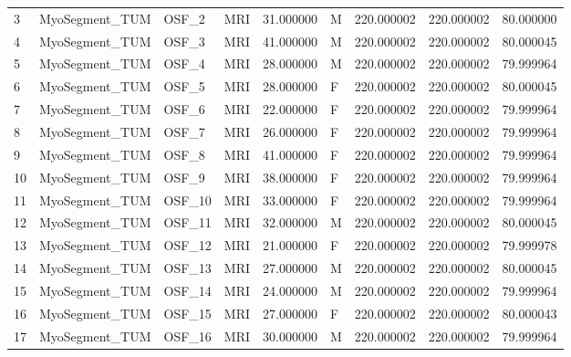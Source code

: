 \begin{tabular}{llllrlrrr}
3      &  MyoSegment\_TUM &        OSF\_2 &                MRI &  31.000000 &        M &       220.000002 &    220.000002 &   80.000000 \\
4      &  MyoSegment\_TUM &        OSF\_3 &                MRI &  41.000000 &        M &       220.000002 &    220.000002 &   80.000045 \\
5      &  MyoSegment\_TUM &        OSF\_4 &                MRI &  28.000000 &        M &       220.000002 &    220.000002 &   79.999964 \\
6      &  MyoSegment\_TUM &        OSF\_5 &                MRI &  28.000000 &        F &       220.000002 &    220.000002 &   80.000045 \\
7      &  MyoSegment\_TUM &        OSF\_6 &                MRI &  22.000000 &        F &       220.000002 &    220.000002 &   79.999964 \\
8      &  MyoSegment\_TUM &        OSF\_7 &                MRI &  26.000000 &        F &       220.000002 &    220.000002 &   79.999964 \\
9      &  MyoSegment\_TUM &        OSF\_8 &                MRI &  41.000000 &        F &       220.000002 &    220.000002 &   79.999964 \\
10     &  MyoSegment\_TUM &        OSF\_9 &                MRI &  38.000000 &        F &       220.000002 &    220.000002 &   79.999964 \\
11     &  MyoSegment\_TUM &       OSF\_10 &                MRI &  33.000000 &        F &       220.000002 &    220.000002 &   79.999964 \\
12     &  MyoSegment\_TUM &       OSF\_11 &                MRI &  32.000000 &        M &       220.000002 &    220.000002 &   80.000045 \\
13     &  MyoSegment\_TUM &       OSF\_12 &                MRI &  21.000000 &        F &       220.000002 &    220.000002 &   79.999978 \\
14     &  MyoSegment\_TUM &       OSF\_13 &                MRI &  27.000000 &        M &       220.000002 &    220.000002 &   80.000045 \\
15     &  MyoSegment\_TUM &       OSF\_14 &                MRI &  24.000000 &        M &       220.000002 &    220.000002 &   79.999964 \\
16     &  MyoSegment\_TUM &       OSF\_15 &                MRI &  27.000000 &        F &       220.000002 &    220.000002 &   80.000043 \\
17     &  MyoSegment\_TUM &       OSF\_16 &                MRI &  30.000000 &        M &       220.000002 &    220.000002 &   79.999964 \\

\end{tabular}
